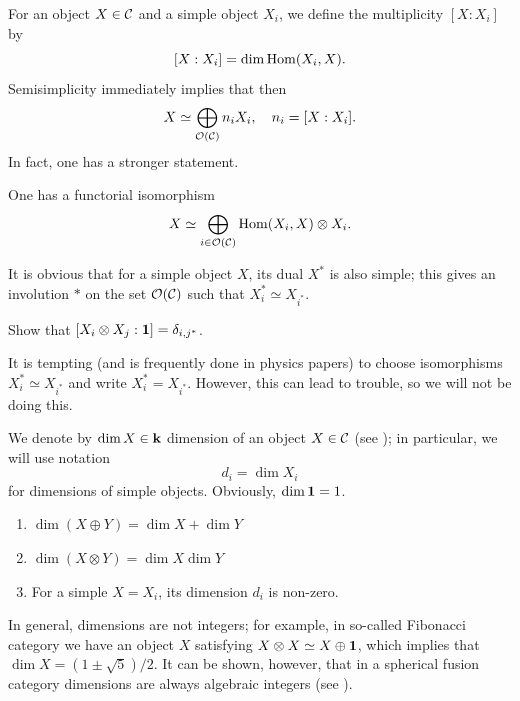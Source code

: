 For an object $X\in \mathcal{C}$ and a simple object $X_i$, we define the multiplicity
$[X:X_i]$ by
$$
  [X:X_i]=\dim \operatorname{Hom}(X_i, X).
$$
Semisimplicity immediately implies
that then
$$
  X\simeq \bigoplus_{\mathcal{O}(\mathcal{C})} n_i X_i, \quad n_i = [X:X_i].
$$
In fact, one has a stronger statement.
\begin{lemma}\label{l:simple}
  One has a functorial isomorphism
  $$
    X\simeq \bigoplus_{i\in\mathcal{O}(\mathcal{C})} \operatorname{Hom}(X_i, X)\otimes X_i.
  $$
\end{lemma}

It is
obvious that for a simple object $X$, its dual $X^*$ is also simple; this gives
an involution $*$ on the set $\mathcal{O}(\mathcal{C})$ such that $X_i^*\simeq X_{i^*}$.

\begin{exercise}\label{ec:duality-spherical}
  Show that $[X_i\otimes X_j:\mathbf{1}]=\delta_{i, j^*}$.
\end{exercise}

\begin{remark}
  It is tempting (and is frequently done in physics papers) to choose
  isomorphisms $X_{i}^*\simeq X_{i^*}$ and write $X_i^*=X_{i^*}$. However, this
  can lead to trouble, so we will not be doing this.
\end{remark}


We denote by $\dim X\in \mathbf{k}$ dimension of an object $X\in \mathcal{C}$ (see
); in particular, we will use notation
$$
d_i=\dim X_i
$$
for dimensions of simple objects. Obviously, $\dim \mathbf{1} =1$.

\begin{lemma}\label{l:dim-properties} \par\noindent
  \begin{enumerate}
    \item $\dim (X\oplus Y)= \dim X +\dim Y$
    \item $\dim (X\otimes Y)= \dim X \dim Y$
    \item For a simple $X=X_i$, its dimension $d_i$ is non-zero.
  \end{enumerate}
\end{lemma}

\begin{remark}
  In general, dimensions are not integers; for example, in so-called Fibonacci
  category we have an object $X$ satisfying $X\otimes X\simeq X\oplus \mathbf{1}$,
  which implies that $\dim X= (1\pm \sqrt{5})/2$. It can be shown, however, that
  in a spherical fusion category dimensions are always algebraic integers (see
  \cite[Corollary 4.7.13]{etingof-fusion}).
\end{remark}

